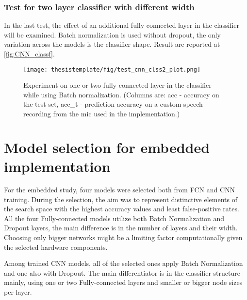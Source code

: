 \subsubsection{Test for two layer classifier with different width}

In the last test, the effect of an additional fully connected layer in the classifier will be examined. Batch normalization is used without dropout, the only variation across the models is the classifier shape. Result are reported at \autoref{fig:CNN_classf}.

\begin{figure}[h!]
  \begin{center}
    \texttt{[image: thesistemplate/fig/test\_cnn\_clss2\_plot.png]}
    \caption{Experiment on one or two fully connected layer in the classifier while using Batch normalization. (Columns are: acc - accuracy on the test set, acc\_t - prediction accuracy on a custom speech recording from the mic used in the implementation.)}
    \label{fig:CNN_classf}
  \end{center}
\end{figure}




\section{Model selection for embedded implementation}

For the embedded study, four models were selected both from FCN and CNN training. During the selection, the aim was to represent distinctive elements of the search space with the highest accuracy values and least false-positive rates. All the four Fully-connected models utilize both Batch Normalization and Dropout layers, the main difference is in the number of layers and their width. Choosing only bigger networks might be a limiting factor computationally given the selected hardware components.

Among trained CNN models, all of the selected ones apply Batch Normalization and one also with Dropout. The main differentiator is in the classifier structure mainly, using one or two Fully-connected layers and smaller or bigger node sizes per layer.
\newline




